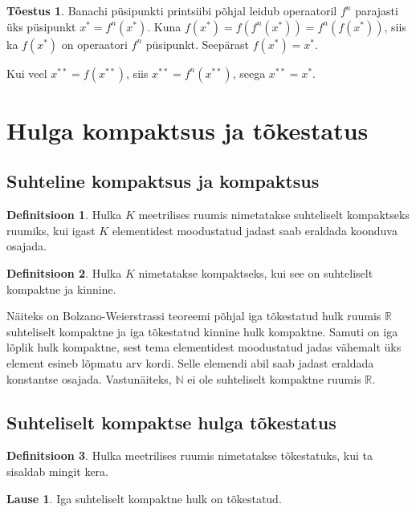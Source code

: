 \documentclass{article}[12pt]
\newcommand{\R}{\mathbb{R}}
\newcommand{\N}{\mathbb{N}}
\theoremstyle{definition}
\newtheorem{definition}{Definitsioon}[section]
\theoremstyle{definition}
\theoremstyle{definition}
\newtheorem{lause}{Lause}[section]
\theoremstyle{break}
\newtheorem*{toestus}{Tõestus}
\begin{document}
\begin{toestus}
	Banachi püsipunkti printsiibi põhjal leidub operaatoril $f^n$ parajasti üks püsipunkt $x^* = f^n(x^*)$.
	Kuna $f(x^*) = f(f^n(x^*)) = f^n(f(x^*))$, siis ka $f(x^*)$ on operaatori $f^n$ püsipunkt. Seepärast $f(x^*) = x^*$.

	Kui veel $x^{**} = f(x^{**})$, siis $x^{**} = f^n(x^{**})$, seega $x^{**} = x^*$.
\end{toestus}

\section{Hulga kompaktsus ja tõkestatus}

\subsection{Suhteline kompaktsus ja kompaktsus}

\begin{definition}
	Hulka $K$ meetrilises ruumis nimetatakse suhteliselt kompaktseks ruumiks, kui igast $K$ elementidest moodustatud jadast saab eraldada koonduva osajada.
\end{definition}

\begin{definition}
	Hulka $K$ nimetatakse kompaktseks, kui see on suhteliselt kompaktne ja kinnine.
\end{definition}

Näiteks on Bolzano-Weierstrassi teoreemi põhjal iga tõkestatud hulk ruumis $\R$ suhteliselt kompaktne ja iga tõkestatud kinnine hulk kompaktne. Samuti on iga lõplik hulk kompaktne, sest tema elementidest moodustatud jadas vähemalt üks element esineb lõpmatu arv kordi. Selle elemendi abil saab jadast eraldada konstantse osajada. Vastunäiteks, $\N$ ei ole suhteliselt kompaktne ruumis $\R$.

\subsection{Suhteliselt kompaktse hulga tõkestatus}

\begin{definition}
	Hulka meetrilises ruumis nimetatakse tõkestatuks, kui ta sisaldab mingit kera.
\end{definition}

\begin{lause}
	Iga suhteliselt kompaktne hulk on tõkestatud.
\end{lause}
\end{document}
